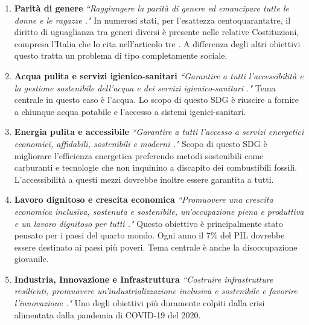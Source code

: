 \begin{enumerate}
\item \textbf{Parità di genere}\newline
\textit{``Raggiungere la parità di genere ed emancipare tutte le donne e le ragazze \cite{goals}."}\newline
In numerosi stati, per l'esattezza centoquarantatre, il diritto di uguaglianza tra generi diversi è presente nelle relative Costituzioni, compresa l'Italia che lo cita nell'articolo tre \cite{italianCostitution}.\newline
A differenza degli altri obiettivi questo tratta un problema di tipo completamente sociale.
\item \textbf{Acqua pulita e servizi igienico-sanitari}\newline
\textit{``Garantire a tutti l'accessibilità e la gestione sostenibile dell'acqua e dei servizi igienico-sanitari \cite{goals}."}\newline
Tema centrale in questo caso è l'acqua.
Lo scopo di questo SDG è riuscire a fornire a chiunque acqua potabile e l'accesso a sistemi igenici-sanitari.
\item \textbf{Energia pulita e accessibile}\newline
\textit{``Garantire a tutti l'accesso a servizi energetici economici, affidabili, sostenibili e moderni \cite{goals}."}\newline
Scopo di questo SDG è migliorare l'efficienza energetica preferendo metodi sostenibili come carburanti e tecnologie che non inquinino a discapito dei combustibili fossili. L'accessibilità a questi mezzi dovrebbe inoltre essere garantita a tutti.
\item \textbf{Lavoro dignitoso e crescita economica}\newline
\textit{``Promuovere una crescita economica inclusiva, sostenuta e sostenibile, un’occupazione piena e produttiva e un lavoro dignitoso per tutti \cite{goals}."}\newline
Questo obiettivo è principalmente stato pensato per i paesi del quarto mondo.
Ogni anno il 7\% del PIL dovrebbe essere destinato ai paesi più poveri.
Tema centrale è anche la disoccupazione giovanile.
\item \textbf{Industria, Innovazione e Infrastruttura}\newline
\textit{``Costruire infrastrutture resilienti, promuovere un’industrializzazione inclusiva e sostenibile e favorire l’innovazione \cite{goals}."}\newline
Uno degli obiettivi più duramente colpiti dalla crisi alimentata dalla pandemia di COVID-19 del 2020.

\end{enumerate}
